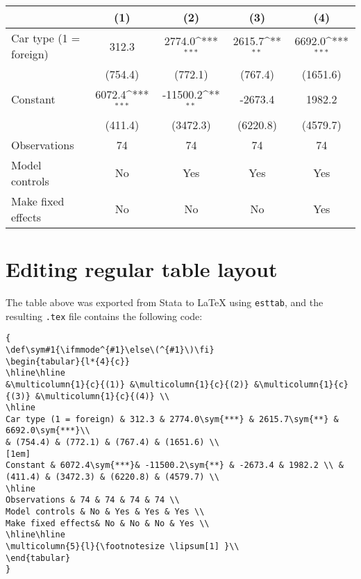 \documentclass[11pt,a4paper]{article}
\begin{document}
\begin{table}[h]
	\begin{threeparttable}
		{
			\def\sym#1{\ifmmode^{#1}\else\(^{#1}\)\fi}
			\begin{tabular}{l*{4}{c}}
				\hline\hline
				&\multicolumn{1}{c}{(1)} &\multicolumn{1}{c}{(2)} &\multicolumn{1}{c}{(3)} &\multicolumn{1}{c}{(4)} \\
				\hline
				Car type (1 = foreign) & 312.3 & 2774.0\sym{***} & 2615.7\sym{**} & 6692.0\sym{***}\\
				& (754.4) & (772.1) & (767.4) & (1651.6) \\
				[1em]
				Constant & 6072.4\sym{***}& -11500.2\sym{**} & -2673.4 & 1982.2 \\ & (411.4) & (3472.3) & (6220.8) & (4579.7) \\
				\hline
				Observations & 74 & 74 & 74 & 74 \\
				Model controls & No & Yes & Yes & Yes \\
				Make fixed effects& No & No & No & Yes \\
				\hline\hline 
			\end{tabular}
			\begin{tablenotes} 
				\footnotesize \item \lipsum[1] 
			\end{tablenotes}
		}
	\end{threeparttable}
\end{table}

\section{Editing regular table layout}

The table above was exported from Stata to {\LaTeX} using \texttt{esttab}, and the resulting \texttt{.tex} file contains the following code:

\begin{tiny}
\begin{verbatim}
{
\def\sym#1{\ifmmode^{#1}\else\(^{#1}\)\fi}
\begin{tabular}{l*{4}{c}}
\hline\hline
&\multicolumn{1}{c}{(1)} &\multicolumn{1}{c}{(2)} &\multicolumn{1}{c}{(3)} &\multicolumn{1}{c}{(4)} \\
\hline
Car type (1 = foreign) & 312.3 & 2774.0\sym{***} & 2615.7\sym{**} & 6692.0\sym{***}\\
& (754.4) & (772.1) & (767.4) & (1651.6) \\
[1em]
Constant & 6072.4\sym{***}& -11500.2\sym{**} & -2673.4 & 1982.2 \\ & (411.4) & (3472.3) & (6220.8) & (4579.7) \\
\hline
Observations & 74 & 74 & 74 & 74 \\
Model controls & No & Yes & Yes & Yes \\
Make fixed effects& No & No & No & Yes \\
\hline\hline 
\multicolumn{5}{l}{\footnotesize \lipsum[1] }\\ 
\end{tabular}
}
\end{verbatim}
\end{tiny}
\end{document}

